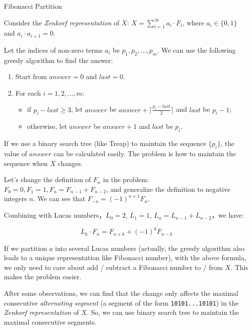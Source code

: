 \begin{tutorial}{Fibonacci Partition}

\providecommand{\url}[1]{\underline{\texttt{#1}}}

Consider the \textit{Zenkorf representation} of $X$: $X=\sum\limits_{i=1}^{\infty} a_i \cdot F_i$, where $a_i \in \{0, 1\}$ and $a_i \cdot a_{i+1} = 0$.

Let the indices of non-zero terms $a_i$ be $p_1,p_2,\ldots,p_m$. We can use the following greedy algorithm to find the answer:

\begin{enumerate}
\item Start from $\mathit{answer}=0$ and $\mathit{last}=0$.
\item For each $i=1,2,\ldots,m$:
\begin{itemize}
\item if $p_i-last \ge 3$, let $\mathit{answer}$ be $\mathit{answer} + \lceil \frac{p_i - last}{2} \rceil$ and $\mathit{last}$ be $p_i-1$;
\item otherwise, let $\mathit{answer}$ be $\mathit{answer}+1$ and $\mathit{last}$ be $p_i$.
\end{itemize}
\end{enumerate}

If we use a binary search tree (like Treap) to maintain the sequence $\{p_i\}$, the value of $\mathit{answer}$ can be calculated easily. The problem is how to maintain the sequence when $X$ changes.

Let's change the definition of $F_n$ in the problem: $F_0=0,F_1=1,F_n=F_{n-1}+F_{n-2}$, and generalize the definition to negative integers $n$. We can see that $F_{-n}=(-1)^{n+1}F_n$.

Combining with Lucas numbers，$L_0=2$, $L_1=1$, $L_n=L_{n-1}+L_{n-2}$，we have:

$$
L_k \cdot F_n = F_{n+k} + (-1)^kF_{n-k}
$$

If we partition $a$ into several Lucas numbers (actually, the greedy algorithm also leads to a unique representation like Fibonacci number), with the above formula, we only need to care about add / subtract a Fibonacci number to / from $X$. This makes the problem easier.

After some observations, we can find that the change only affects the maximal consecutive \textit{alternating segment} (a segment of the form \texttt{10101...10101}) in the \textit{Zenkorf representation} of $X$. So, we can use binary search tree to maintain the maximal consecutive segments.


\end{tutorial}
